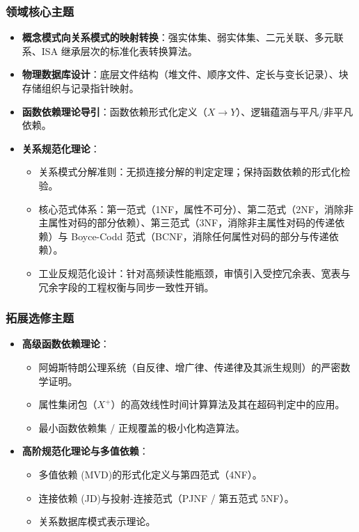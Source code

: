 \subsubsection{领域核心主题}
\begin{itemize}
    \item \textbf{概念模式向关系模式的映射转换}：强实体集、弱实体集、二元关联、多元联系、ISA 继承层次的标准化表转换算法。
    \item \textbf{物理数据库设计}：底层文件结构（堆文件、顺序文件、定长与变长记录）、块存储组织与记录指针映射。
    \item \textbf{函数依赖理论导引}：函数依赖形式化定义（$X \to Y$）、逻辑蕴涵与平凡/非平凡依赖。
    \item \textbf{关系规范化理论}：
    \begin{itemize}
        \item 关系模式分解准则：无损连接分解的判定定理；保持函数依赖的形式化检验。
        \item 核心范式体系：第一范式（1NF，属性不可分）、第二范式（2NF，消除非主属性对码的部分依赖）、第三范式（3NF，消除非主属性对码的传递依赖）与 Boyce-Codd 范式（BCNF，消除任何属性对码的部分与传递依赖）。
        \item 工业反规范化设计：针对高频读性能瓶颈，审慎引入受控冗余表、宽表与冗余字段的工程权衡与同步一致性开销。
    \end{itemize}
\end{itemize}

\subsubsection{拓展选修主题}
\begin{itemize}
    \item \textbf{高级函数依赖理论}：
    \begin{itemize}
        \item 阿姆斯特朗公理系统（自反律、增广律、传递律及其派生规则）的严密数学证明。
        \item 属性集闭包（$X^+$）的高效线性时间计算算法及其在超码判定中的应用。
        \item 最小函数依赖集 / 正规覆盖的极小化构造算法。
    \end{itemize}
    \item \textbf{高阶规范化理论与多值依赖}：
    \begin{itemize}
        \item 多值依赖 (MVD)的形式化定义与第四范式（4NF）。
        \item 连接依赖 (JD)与投射-连接范式（PJNF / 第五范式 5NF）。
        \item 关系数据库模式表示理论。
    \end{itemize}
\end{itemize}

